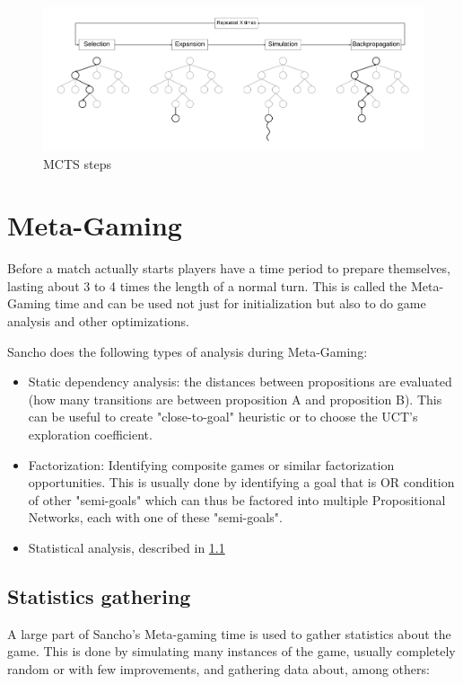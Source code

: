 \newpage

\begin{figure}[h]
	\centering
	\includegraphics[width=\textwidth]{images/MCTS.pdf}
	\caption{MCTS steps}
	\label{fig:mcts steps}
\end{figure}


\section{Meta-Gaming}
Before a match actually starts players have a time period to prepare themselves, lasting about 3 to 4 times the length of a normal turn. This is called the Meta-Gaming time and can be used not just for initialization but also to do game analysis and other optimizations.

Sancho does the following types of analysis during Meta-Gaming: 
\begin{itemize}
	\item Static dependency analysis: the distances between propositions are evaluated (how many transitions are between proposition A and proposition B). This can be useful to create "close-to-goal" heuristic or to choose the UCT's exploration coefficient. 
	
	\item Factorization: Identifying composite games or similar factorization opportunities. This is usually done by identifying a goal that is OR condition of other "semi-goals" which can thus be factored into multiple Propositional Networks, each with one of these "semi-goals".	 
	
	\item Statistical analysis, described in \ref{sssec:statistics_gathering}
\end{itemize}

\subsection{Statistics gathering}
\label{sssec:statistics_gathering}
A large part of Sancho's Meta-gaming time is used to gather statistics about the game. This is done by simulating many instances of the game, usually completely random or with few improvements, and gathering data about, among others:

